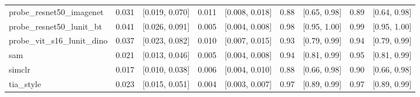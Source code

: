 \begin{tabular}{lrrrrrrrr}
probe\_resnet50\_imagenet & 0.031 & [0.019, 0.070] & 0.011 & [0.008, 0.018] & 0.88 & [0.65, 0.98] & 0.89 & [0.64, 0.98] \\
probe\_resnet50\_lunit\_bt & 0.041 & [0.026, 0.091] & 0.005 & [0.004, 0.008] & 0.98 & [0.95, 1.00] & 0.99 & [0.95, 1.00] \\
probe\_vit\_s16\_lunit\_dino & 0.037 & [0.023, 0.082] & 0.010 & [0.007, 0.015] & 0.93 & [0.79, 0.99] & 0.94 & [0.79, 0.99] \\
sam & 0.021 & [0.013, 0.046] & 0.005 & [0.004, 0.008] & 0.94 & [0.81, 0.99] & 0.95 & [0.81, 0.99] \\
simclr & 0.017 & [0.010, 0.038] & 0.006 & [0.004, 0.010] & 0.88 & [0.66, 0.98] & 0.90 & [0.66, 0.98] \\
tia\_style & 0.023 & [0.015, 0.051] & 0.004 & [0.003, 0.007] & 0.97 & [0.89, 0.99] & 0.97 & [0.89, 0.99] \\
\bottomrule
\end{tabular}

